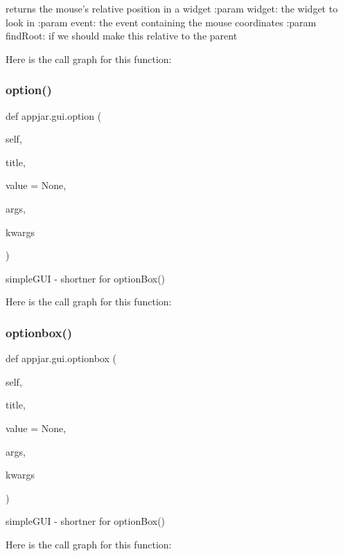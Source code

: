 \begin{DoxyVerb}
\begin{DoxyVerb}returns the mouse's relative position in a widget
:param widget: the widget to look in
:param event: the event containing the mouse coordinates
:param findRoot: if we should make this relative to the parent
\end{DoxyVerb}
 Here is the call graph for this function\+:
\mbox{\label{classappjar_1_1gui_a641fb93f7f581e3fdd4357736f256f2c}} 
\subsubsection{\texorpdfstring{option()}{option()}}
{\footnotesize\ttfamily def appjar.\+gui.\+option (\begin{DoxyParamCaption}\item[{}]{self,  }\item[{}]{title,  }\item[{}]{value = {\ttfamily None},  }\item[{}]{args,  }\item[{}]{kwargs }\end{DoxyParamCaption})}

\begin{DoxyVerb}simpleGUI - shortner for optionBox() \end{DoxyVerb}
 Here is the call graph for this function\+:
\mbox{\label{classappjar_1_1gui_a6bb84e16fbe909443e902f799a6c4f9e}} 
\subsubsection{\texorpdfstring{optionbox()}{optionbox()}}
{\footnotesize\ttfamily def appjar.\+gui.\+optionbox (\begin{DoxyParamCaption}\item[{}]{self,  }\item[{}]{title,  }\item[{}]{value = {\ttfamily None},  }\item[{}]{args,  }\item[{}]{kwargs }\end{DoxyParamCaption})}

\begin{DoxyVerb}simpleGUI - shortner for optionBox() \end{DoxyVerb}
 Here is the call graph for this function\+:
\mbox{\label{classappjar_1_1gui_a1e6823f3213d880cd6d4218757f4f617}} 

\end{DoxyVerb}
